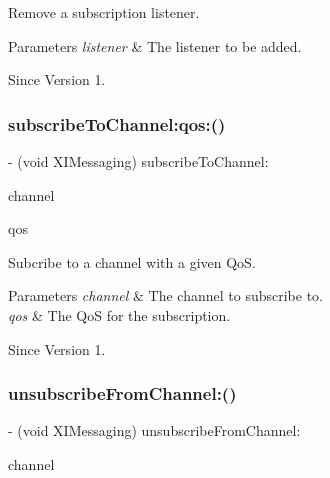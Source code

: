 Remove a subscription listener. 


\begin{DoxyParams}{Parameters}
{\em listener} & The listener to be added. \\
\hline
\end{DoxyParams}
\begin{DoxySince}{Since}
Version 1. 
\end{DoxySince}
\hypertarget{protocol_x_i_messaging_01-p_a709f4377e80640789a751b71f1c7eb17}{}\label{protocol_x_i_messaging_01-p_a709f4377e80640789a751b71f1c7eb17} 
\subsubsection{\texorpdfstring{subscribe\+To\+Channel\+:qos\+:()}{subscribeToChannel:qos:()}}
{\footnotesize\ttfamily -\/ (void X\+I\+Messaging) subscribe\+To\+Channel\+: \begin{DoxyParamCaption}\item[{(N\+S\+String $\ast$)}]{channel }\item[{qos:(X\+I\+Messaging\+QoS)}]{qos }\end{DoxyParamCaption}}



Subcribe to a channel with a given QoS. 


\begin{DoxyParams}{Parameters}
{\em channel} & The channel to subscribe to. \\
\hline
{\em qos} & The QoS for the subscription. \\
\hline
\end{DoxyParams}
\begin{DoxySince}{Since}
Version 1. 
\end{DoxySince}
\hypertarget{protocol_x_i_messaging_01-p_afe2bfff1aeb2eec7f7af7aab942d8711}{}\label{protocol_x_i_messaging_01-p_afe2bfff1aeb2eec7f7af7aab942d8711} 
\subsubsection{\texorpdfstring{unsubscribe\+From\+Channel\+:()}{unsubscribeFromChannel:()}}
{\footnotesize\ttfamily -\/ (void X\+I\+Messaging) unsubscribe\+From\+Channel\+: \begin{DoxyParamCaption}\item[{(N\+S\+String $\ast$)}]{channel }\end{DoxyParamCaption}}



